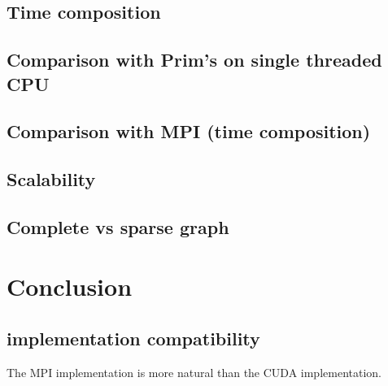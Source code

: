 \documentclass[english, 12pt, a4paper, elec, utf8, a-2b, online]{aaltothesis}
\begin{document}
\subsection{Time composition}
\subsection{Comparison with Prim's on single threaded CPU}
\subsection{Comparison with MPI (time composition)}
\subsection{Scalability}
\subsection{Complete vs sparse graph}

\clearpage
\section{Conclusion}
\subsection{implementation compatibility}
The MPI implementation is more natural than the CUDA implementation. 

\clearpage
\thesisbibliography
\end{document}
